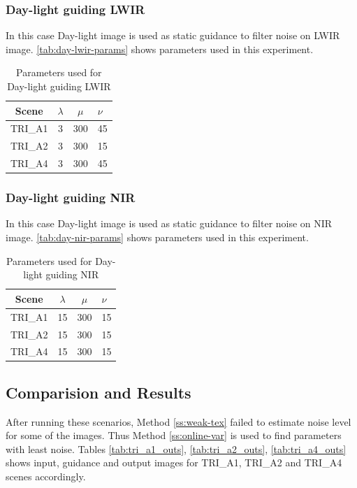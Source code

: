 \documentclass[10pt,twocolumn,letterpaper]{article}
\begin{document}
	\subsubsection{Day-light guiding LWIR}
	In this case Day-light image is used as static guidance to filter noise on LWIR image. \autoref{tab:day-lwir-params} shows parameters used in this experiment.
	\begin{table}[!ht]
		\centering
		\caption{Parameters used for Day-light guiding LWIR}
		\label{tab:day-lwir-params}
		\begin{tabular}{@{}cccl@{}}
			\toprule
			\bfseries Scene & \(\lambda\) & \(\mu\) & \(\nu\) \\ \midrule
			TRI\_A1               & 3        	& 300	  & 45       \\
			TRI\_A2               & 3        	& 300	  & 15       \\
			TRI\_A4               & 3        	& 300	  & 45       \\ \bottomrule
		\end{tabular}
	\end{table}
	\subsubsection{Day-light guiding NIR}
	In this case Day-light image is used as static guidance to filter noise on NIR image. \autoref{tab:day-nir-params} shows parameters used in this experiment.
	\begin{table}[!ht]
		\centering
		\caption{Parameters used for Day-light guiding NIR}
		\label{tab:day-nir-params}
		\begin{tabular}{@{}cccl@{}}
			\toprule
			\bfseries Scene & \(\lambda\) & \(\mu\) & \(\nu\) \\ \midrule
			TRI\_A1               & 15        	& 300	  & 15       \\
			TRI\_A2               & 15       	& 300	  & 15       \\
			TRI\_A4               & 15       	& 300	  & 15       \\ \bottomrule
		\end{tabular}
	\end{table}
\subsection{Comparision and Results}	
	After running these scenarios, Method \ref{ss:weak-tex} failed to estimate noise level for some of the images. Thus Method \ref{ss:online-var} is used to find parameters with least noise. Tables \ref{tab:tri_a1_outs}, \ref{tab:tri_a2_outs}, \ref{tab:tri_a4_outs} shows input, guidance and output images for TRI\_A1, TRI\_A2 and TRI\_A4 scenes accordingly.
	
\end{document}
